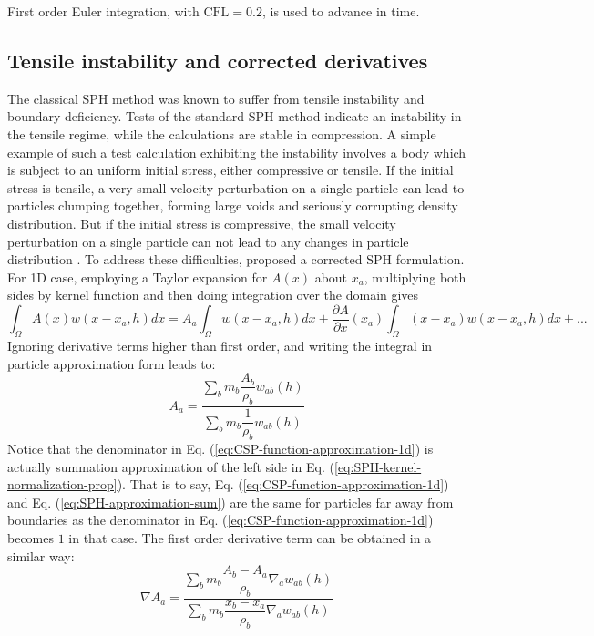 \documentclass[gmd, manuscript]{copernicus}
\begin{document}
First order Euler integration, with $\textrm{CFL} = 0.2$, is used to advance in time.

\subsection{Tensile instability and corrected derivatives}
The classical SPH method was known to suffer from tensile instability and boundary deficiency. Tests of the standard SPH method indicate an instability in the tensile regime, while the calculations are stable in compression.  A simple example of such a test calculation exhibiting the instability involves a body which is subject to an uniform initial stress, either compressive or tensile. If the initial stress is tensile, a very small velocity perturbation on a single particle can lead to particles clumping together, forming large voids and seriously corrupting density distribution. But if the initial stress is compressive, the small velocity perturbation on a single particle can not lead to any changes in particle distribution \citep{swegle1995smoothed}. To address these difficulties, \citet{chen1999improvement} proposed a corrected SPH formulation. For 1D case, employing a Taylor expansion for $A\left(x\right)$ about $x_a$, multiplying both sides by kernel function and then doing integration over the domain gives
\begin{equation}
\int_{\Omega} A\left(x\right) w\left(x- x_a, h\right) dx = 
A_a \int_{\Omega} w\left(x - x_a, h\right) dx +\dfrac{\partial A}{\partial x}(x_a) \int_{\Omega} \left(x-x_a\right) w\left(x - x_a, h\right) dx +...
\end{equation}
Ignoring derivative terms higher than first order, and writing the integral in particle approximation form leads to:
\begin{equation}
A_a = \frac{\sum_b m_b \dfrac{A_b}{\rho_b} w_{ab}\left(h\right)}{\sum_b m_b \dfrac{1}{\rho_b} w_{ab}\left(h\right)}
\label{eq:CSP-function-approximation-1d}
\end{equation}
Notice that the denominator in Eq. (\ref{eq:CSP-function-approximation-1d}) is actually summation approximation of the left side in Eq. (\ref{eq:SPH-kernel-normalization-prop}). That is to say, Eq. (\ref{eq:CSP-function-approximation-1d}) and Eq. (\ref{eq:SPH-approximation-sum}) are the same for particles far away from boundaries as the denominator in Eq. (\ref{eq:CSP-function-approximation-1d}) becomes $1$ in that case.
The first order derivative term can be obtained in a similar way:
\begin{equation}
\nabla A_a = \frac{\sum_b m_b \dfrac{A_b - A_a}{\rho_b} \nabla_a w_{ab}\left(h\right)}{\sum_b m_b \dfrac{x_b - x_a}{\rho_b} \nabla_a w_{ab}\left( h\right)}
\end{equation}
\end{document}
